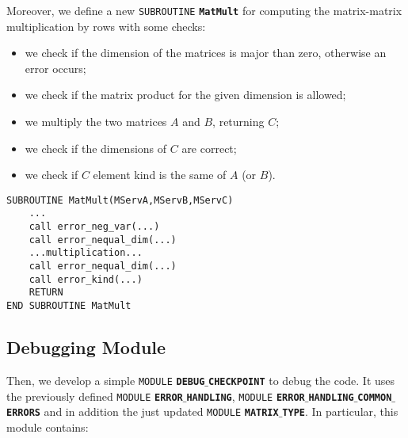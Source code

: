 \documentclass[rmp,10pt,onecolumn,fleqn,notitlepage]{revtex4-1}
\begin{document}
Moreover, we define a new \texttt{SUBROUTINE} {\bfseries\texttt{MatMult}} for computing the matrix-matrix multiplication by rows with some checks:

\begin{center}
  \begin{minipage}[t]{0.52\linewidth}%

      \begin{itemize}
      \item we check if the dimension of the matrices is major than zero, otherwise an error occurs;
      \item we check if the matrix product for the given dimension is allowed;
      \item we multiply the two matrices \( A \) and \( B \), returning \( C \);
      \item we check if the dimensions of \( C \) are correct;
      \item we check if \( C \) element kind is the same of \( A \) (or \( B \)).
      \end{itemize}

  \end{minipage}
  \hspace{1.2cm}
  \begin{minipage}[t]{0.38\linewidth}%
  \begin{lstlisting}[style=Fortran]
SUBROUTINE MatMult(MServA,MServB,MServC)
    ...
    call error_neg_var(...)
    call error_nequal_dim(...)
    ...multiplication...
    call error_nequal_dim(...)
    call error_kind(...)
    RETURN
END SUBROUTINE MatMult
\end{lstlisting}
  \end{minipage}
\end{center}



\subsection{Debugging Module}
Then, we develop a simple \texttt{MODULE} {\bfseries\texttt{DEBUG$\_$CHECKPOINT}} to debug the code. It uses the previously defined  \texttt{MODULE} {\bfseries\texttt{ERROR$\_$HANDLING}}, \texttt{MODULE} {\bfseries\texttt{ERROR$\_$HANDLING$\_$COMMON$\_$ERRORS}} and in addition the just updated \texttt{MODULE} {\bfseries\texttt{MATRIX$\_$TYPE}}.
In particular, this module contains:
\end{document}
